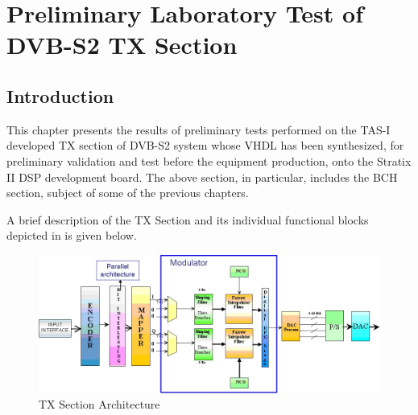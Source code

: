

\chapter{Preliminary Laboratory Test of DVB-S2 TX Section} \label{ch:TestTXSec}

\section{Introduction}

This chapter presents the results of preliminary tests performed on the TAS-I developed TX section of DVB-S2 system whose VHDL has been synthesized, for preliminary validation and test before the equipment production, onto the Stratix II DSP development board. The above section, in particular, includes the BCH section, subject of some of the previous chapters.

A brief description of the TX Section and its individual functional blocks depicted in  is given below.

\begin{figure} \centering
\includegraphics[scale=0.55, angle=90]{TXSection}
\caption{TX Section Architecture}
\label{fig:TXSection}
\end{figure}


